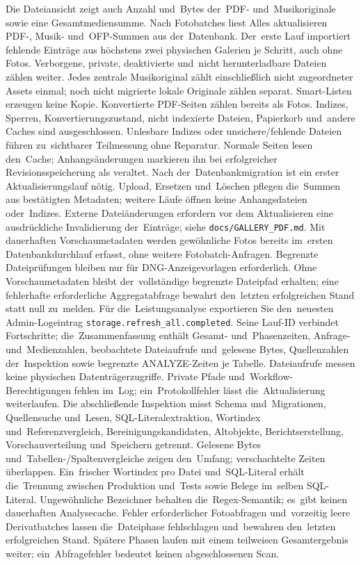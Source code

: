 \documentclass[11pt,a4paper]{article}
\newcommand{\codeword}[1]{\nolinkurl{#1}}
\begin{document}
Die Dateiansicht zeigt auch Anzahl und~Bytes der~PDF- und~Musikoriginale
sowie eine Gesamtmediensumme. Nach Fotobatches liest Alles aktualisieren
PDF-, Musik- und~OFP-Summen aus der~Datenbank. Der~erste Lauf importiert
fehlende
Einträge aus höchstens zwei physischen Galerien je Schritt, auch ohne Fotos.
Verborgene, private, deaktivierte und~nicht herunterladbare Dateien zählen
weiter. Jedes zentrale Musikoriginal zählt einschließlich nicht zugeordneter
Assets einmal; noch nicht migrierte lokale Originale zählen separat.
Smart-Listen erzeugen keine Kopie.
Konvertierte PDF-Seiten zählen bereits als Fotos. Indizes, Sperren,
Konvertierungszustand, nicht indexierte Dateien, Papierkorb und~andere Caches
sind ausgeschlossen. Unlesbare Indizes oder unsichere/fehlende Dateien
führen zu~sichtbarer Teilmessung ohne Reparatur. Normale Seiten lesen den~Cache;
Anhangsänderungen markieren ihn bei erfolgreicher Revisionsspeicherung als
veraltet. Nach der~Datenbankmigration ist ein erster Aktualisierungslauf nötig.
Upload, Ersetzen und~Löschen pflegen die~Summen aus bestätigten Metadaten;
weitere Läufe öffnen keine Anhangsdateien oder~Indizes. Externe Dateiänderungen
erfordern vor dem Aktualisieren eine ausdrückliche Invalidierung der~Einträge;
siehe \codeword{docs/GALLERY\_PDF.md}.
Mit dauerhaften Vorschaumetadaten werden gewöhnliche Fotos bereits im~ersten
Datenbankdurchlauf erfasst, ohne weitere Fotobatch-Anfragen. Begrenzte
Dateiprüfungen
bleiben nur für DNG-Anzeigevorlagen erforderlich. Ohne Vorschaumetadaten bleibt
der~vollständige begrenzte Dateipfad erhalten; eine fehlerhafte erforderliche
Aggregatabfrage bewahrt den~letzten erfolgreichen Stand statt null zu~melden.
Für die~Leistungsanalyse exportieren Sie den~neuesten Admin-Logeintrag
\codeword{storage.refresh\_all.completed}. Seine Lauf-ID verbindet Fortschritte;
die~Zusammenfassung enthält Gesamt- und~Phasenzeiten, Anfrage- und~Medienzahlen,
beobachtete Dateiaufrufe und~gelesene Bytes, Quellenzahlen der~Inspektion sowie
begrenzte ANALYZE-Zeiten je Tabelle. Dateiaufrufe messen keine physischen
Datenträgerzugriffe. Private Pfade und~Workflow-Berechtigungen fehlen im~Log;
ein~Protokollfehler lässt die~Aktualisierung weiterlaufen.
Die abschließende Inspektion misst Schema und~Migrationen, Quellensuche
und~Lesen,
SQL-Literalextraktion, Wortindex und~Referenzvergleich, Bereinigungskandidaten,
Altobjekte, Berichtserstellung, Vorschauverteilung und~Speichern getrennt.
Gelesene Bytes und~Tabellen-/Spaltenvergleiche zeigen den~Umfang; verschachtelte
Zeiten überlappen. Ein~frischer Wortindex pro Datei und~SQL-Literal erhält
die~Trennung zwischen Produktion und~Tests sowie Belege im~selben SQL-Literal.
Ungewöhnliche Bezeichner behalten die~Regex-Semantik; es~gibt keinen dauerhaften
Analysecache.
Fehler erforderlicher Fotoabfragen und~vorzeitig leere Derivatbatches lassen
die~Dateiphase fehlschlagen und~bewahren den~letzten erfolgreichen Stand.
Spätere Phasen laufen mit einem teilweisen Gesamtergebnis weiter;
ein~Abfragefehler bedeutet keinen abgeschlossenen Scan.
\end{document}
